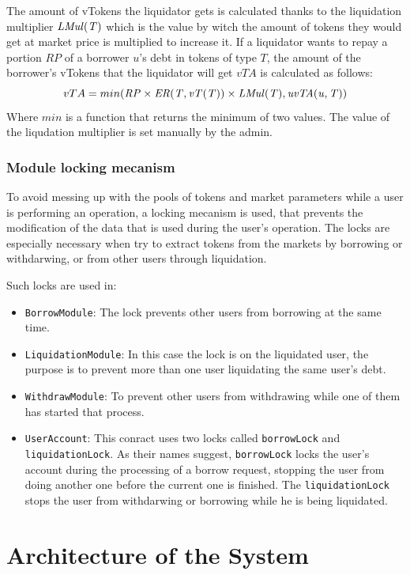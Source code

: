 The amount of vTokens the liquidator gets is calculated thanks to the liquidation multiplier $\mathit{LMul(T)}$ which is the value by witch the amount of tokens they would get at market price is multiplied to increase it. If a liquidator wants to repay a portion $\mathit{RP}$ of a borrower $u$'s debt in tokens of type $T$, the amount of the borrower's vTokens that the liquidator will get $vTA$ is calculated as follows:
$$
  vTA = min(\mathit{RP} \times \mathit{ER(T, \mathit{vT(T)})} \times \mathit{LMul(T)}, \mathit{uvTA(u, T)})
$$
Where $min$ is a function that returns the minimum of two values. The value of the liqudation multiplier is set manually by the admin.

\subsubsection{Module locking mecanism}

To avoid messing up with the pools of tokens and market parameters while a user is performing an operation, a locking mecanism is used, that prevents the modification of the data that is used during the user's operation. The locks are especially necessary when try to extract tokens from the markets by borrowing or withdarwing, or from other users through liquidation.

Such locks are used in:
\begin{itemize}
  \item \verb|BorrowModule|: The lock prevents other users from borrowing at the same time.
  \item \verb|LiquidationModule|: In this case the lock is on the liquidated user, the purpose is to prevent more than one user liquidating the same user's debt.
  \item \verb|WithdrawModule|: To prevent other users from withdrawing while one of them has started that process.
  \item \verb|UserAccount|: This conract uses two locks called \verb|borrowLock| and \verb|liquidationLock|. As their names suggest, \verb|borrowLock| locks the user's account during the processing of a borrow request, stopping the user from doing another one before the current one is finished. The \verb|liquidationLock| stops the user from withdarwing or borrowing while he is being liquidated.
\end{itemize}

\section{Architecture of the System}

